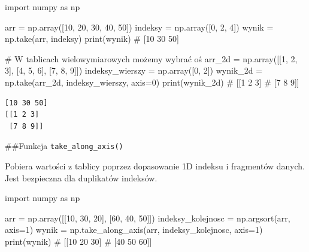 \documentclass[
  letterpaper,
  DIV=11,
  numbers=noendperiod]{scrreprt}
\newenvironment{Shaded}{\begin{snugshade}}{\end{snugshade}}
\newcommand{\BuiltInTok}[1]{\textcolor[rgb]{0.00,0.23,0.31}{#1}}
\newcommand{\CommentTok}[1]{\textcolor[rgb]{0.37,0.37,0.37}{#1}}
\newcommand{\DecValTok}[1]{\textcolor[rgb]{0.68,0.00,0.00}{#1}}
\newcommand{\ImportTok}[1]{\textcolor[rgb]{0.00,0.46,0.62}{#1}}
\newcommand{\NormalTok}[1]{\textcolor[rgb]{0.00,0.23,0.31}{#1}}
\newcommand{\OperatorTok}[1]{\textcolor[rgb]{0.37,0.37,0.37}{#1}}
\begin{document}
\begin{Shaded}
\begin{Highlighting}[]
\ImportTok{import}\NormalTok{ numpy }\ImportTok{as}\NormalTok{ np}

\NormalTok{arr }\OperatorTok{=}\NormalTok{ np.array([}\DecValTok{10}\NormalTok{, }\DecValTok{20}\NormalTok{, }\DecValTok{30}\NormalTok{, }\DecValTok{40}\NormalTok{, }\DecValTok{50}\NormalTok{])}
\NormalTok{indeksy }\OperatorTok{=}\NormalTok{ np.array([}\DecValTok{0}\NormalTok{, }\DecValTok{2}\NormalTok{, }\DecValTok{4}\NormalTok{])}
\NormalTok{wynik }\OperatorTok{=}\NormalTok{ np.take(arr, indeksy)}
\BuiltInTok{print}\NormalTok{(wynik)  }\CommentTok{\# [10 30 50]}

\CommentTok{\# W tablicach wielowymiarowych możemy wybrać oś}
\NormalTok{arr\_2d }\OperatorTok{=}\NormalTok{ np.array([[}\DecValTok{1}\NormalTok{, }\DecValTok{2}\NormalTok{, }\DecValTok{3}\NormalTok{], [}\DecValTok{4}\NormalTok{, }\DecValTok{5}\NormalTok{, }\DecValTok{6}\NormalTok{], [}\DecValTok{7}\NormalTok{, }\DecValTok{8}\NormalTok{, }\DecValTok{9}\NormalTok{]])}
\NormalTok{indeksy\_wierszy }\OperatorTok{=}\NormalTok{ np.array([}\DecValTok{0}\NormalTok{, }\DecValTok{2}\NormalTok{])}
\NormalTok{wynik\_2d }\OperatorTok{=}\NormalTok{ np.take(arr\_2d, indeksy\_wierszy, axis}\OperatorTok{=}\DecValTok{0}\NormalTok{)}
\BuiltInTok{print}\NormalTok{(wynik\_2d)}
\CommentTok{\# [[1 2 3]}
\CommentTok{\#  [7 8 9]]}
\end{Highlighting}
\end{Shaded}

\begin{verbatim}
[10 30 50]
[[1 2 3]
 [7 8 9]]
\end{verbatim}

\#\#Funkcja \texttt{take\_along\_axis()}

Pobiera wartości z tablicy poprzez dopasowanie 1D indeksu i fragmentów
danych. Jest bezpieczna dla duplikatów indeksów.

\begin{Shaded}
\begin{Highlighting}[]
\ImportTok{import}\NormalTok{ numpy }\ImportTok{as}\NormalTok{ np}

\NormalTok{arr }\OperatorTok{=}\NormalTok{ np.array([[}\DecValTok{10}\NormalTok{, }\DecValTok{30}\NormalTok{, }\DecValTok{20}\NormalTok{], [}\DecValTok{60}\NormalTok{, }\DecValTok{40}\NormalTok{, }\DecValTok{50}\NormalTok{]])}
\NormalTok{indeksy\_kolejnosc }\OperatorTok{=}\NormalTok{ np.argsort(arr, axis}\OperatorTok{=}\DecValTok{1}\NormalTok{)}
\NormalTok{wynik }\OperatorTok{=}\NormalTok{ np.take\_along\_axis(arr, indeksy\_kolejnosc, axis}\OperatorTok{=}\DecValTok{1}\NormalTok{)}
\BuiltInTok{print}\NormalTok{(wynik)}
\CommentTok{\# [[10 20 30]}
\CommentTok{\#  [40 50 60]]}
\end{Highlighting}
\end{Shaded}
\end{document}
